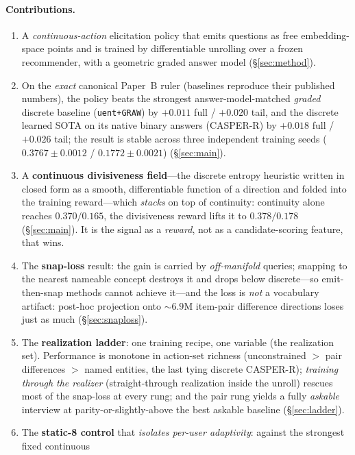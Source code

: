 \documentclass[11pt]{article}
\begin{document}
\paragraph{Contributions.}
\begin{enumerate}
  \item A \emph{continuous-action} elicitation policy that emits questions as free embedding-space points and is trained
  by differentiable unrolling over a frozen recommender, with a geometric graded answer model (\S\ref{sec:method}).
  \item On the \emph{exact} canonical Paper~B ruler (baselines reproduce their published numbers), the policy beats the
  strongest answer-model-matched \emph{graded} discrete baseline (\texttt{uent+GRAW}) by $+0.011$ full / $+0.020$ tail,
  and the discrete learned SOTA on its native binary answers (CASPER-R) by $+0.018$ full / $+0.026$ tail; the result is
  stable across three independent training seeds ($0.3767\pm0.0012$ / $0.1772\pm0.0021$) (\S\ref{sec:main}).
  \item A \textbf{continuous divisiveness field}---the discrete entropy heuristic written in closed form as a smooth,
  differentiable function of a direction and folded into the training reward---which \emph{stacks} on top of continuity:
  continuity alone reaches $0.370/0.165$, the divisiveness reward lifts it to $0.378/0.178$ (\S\ref{sec:main}). It is the
  signal as a \emph{reward}, not as a candidate-scoring feature, that wins.
  \item The \textbf{snap-loss} result: the gain is carried by \emph{off-manifold} queries; snapping to the nearest
  nameable concept destroys it and drops below discrete---so emit-then-snap methods cannot achieve it---and the loss is
  \emph{not} a vocabulary artifact: post-hoc projection onto ${\sim}6.9$M item-pair difference directions loses just as
  much (\S\ref{sec:snaploss}).
  \item The \textbf{realization ladder}: one training recipe, one variable (the realization set). Performance is
  monotone in action-set richness (unconstrained $>$ pair differences $>$ named entities, the last tying discrete
  CASPER-R); \emph{training through the realizer} (straight-through realization inside the unroll) rescues most of the
  snap-loss at every rung; and the pair rung yields a fully \emph{askable} interview at parity-or-slightly-above the
  best askable baseline (\S\ref{sec:ladder}).
  \item The \textbf{static-8 control} that \emph{isolates per-user adaptivity}: against the strongest fixed continuous

\end{enumerate}
\end{document}
